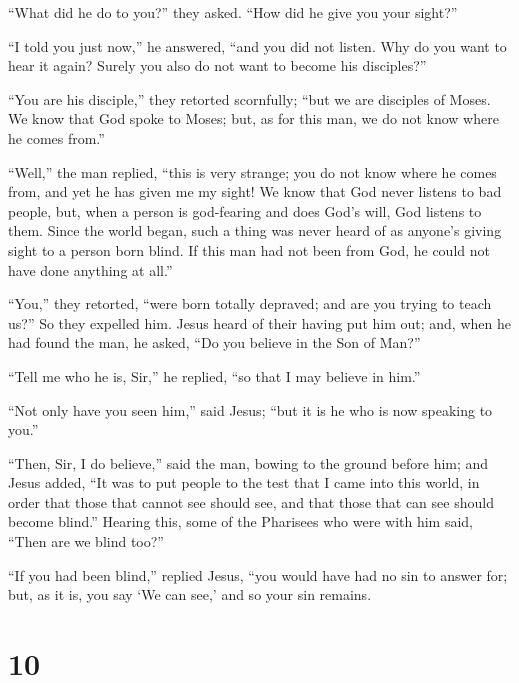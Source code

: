  ``What did he do to you?'' they asked. ``How did he give
you your sight?''

 ``I told you just now,'' he answered, ``and you did not
listen. Why do you want to hear it again? Surely you also do not want to
become his disciples?''

 ``You are his disciple,'' they retorted scornfully; ``but
we are disciples of Moses.  We know that God spoke to
Moses; but, as for this man, we do not know where he comes from.''

 ``Well,'' the man replied, ``this is very strange; you do
not know where he comes from, and yet he has given me my sight!
 We know that God never listens to bad people, but, when a
person is god-fearing and does God's will, God listens to them.
 Since the world began, such a thing was never heard of as
anyone's giving sight to a person born blind.  If this man
had not been from God, he could not have done anything at all.''

 ``You,'' they retorted, ``were born totally depraved; and
are you trying to teach us?'' So they expelled him.  Jesus
heard of their having put him out; and, when he had found the man, he
asked, ``Do you believe in the Son of Man?''

 ``Tell me who he is, Sir,'' he replied, ``so that I may
believe in him.''

 ``Not only have you seen him,'' said Jesus; ``but it is he
who is now speaking to you.''

 ``Then, Sir, I do believe,'' said the man, bowing to the
ground before him;  and Jesus added, ``It was to put people
to the test that I came into this world, in order that those that cannot
see should see, and that those that can see should become blind.''
 Hearing this, some of the Pharisees who were with him
said, ``Then are we blind too?''

 ``If you had been blind,'' replied Jesus, ``you would have
had no sin to answer for; but, as it is, you say `We can see,' and so
your sin remains.

\hypertarget{section-9}{%
\section{10}\label{section-9}}

